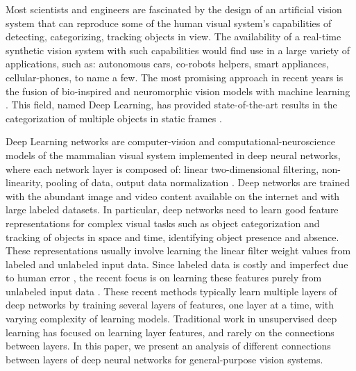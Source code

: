 \documentclass{article} %
\begin{document}
Most scientists and engineers are fascinated by the design of an artificial vision system that can reproduce some of the human visual system's capabilities of detecting, categorizing, tracking objects in view. 
The availability of a real-time synthetic vision system with such capabilities would find use in a large 
variety of applications, such as: autonomous cars, co-robots helpers, smart appliances, cellular-phones, to name a few. 
The most promising approach in recent years is the fusion of bio-inspired and neuromorphic vision models with machine learning 
\cite{lecun_gradient-based_1998,hadsell_dimensionality_2006,gregor_structured_2011,riesenhuber_hierarchical_1999,serre_feedforward_2007,serre_neuromorphic_2010,jarrett_what_2009,lecun_convolutional_2010,boureau_theoretical_2010}.
This field, named Deep Learning, has provided state-of-the-art results in the categorization 
of multiple objects in static frames \cite{krizhevsky_imagenet_2012}.

Deep Learning networks are computer-vision and computational-neuroscience models of the mammalian visual 
system implemented in deep neural networks, where each network layer is composed of: linear two-dimensional filtering, 
non-linearity, pooling of data, output data normalization \cite{jarrett_what_2009,lecun_convolutional_2010,boureau_theoretical_2010}. 
Deep networks are trained with the abundant image and video content available on the internet and with large labeled datasets. 
In particular, deep networks need to learn good feature representations for complex visual tasks such as object categorization and 
tracking of objects in space and time, identifying object presence and absence.
These representations usually involve learning the linear filter weight values from labeled and unlabeled input data.
Since labeled data is costly and imperfect due to human error 
\cite{karpathy_lessons_2011, torralba_unbiased_2011, hou_meta-theory_2012}, the recent focus is on learning these features purely 
from unlabeled input data \cite{olshausen_emergence_1996, hyvarinen_independent_2000, hinton_fast_2006, vincent_extracting_2008, coates_analysis_2011}.
These recent methods typically learn multiple layers of deep networks by training several layers of features, one layer at a time, with varying complexity of learning models.
Traditional work in unsupervised deep learning has focused on learning layer features, and rarely on the connections between layers.
In this paper, we present an analysis of different connections between layers of deep neural networks for general-purpose vision systems. 
\end{document}
